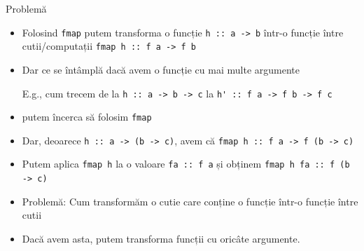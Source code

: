 \documentclass[xcolor=pdftex,romanian,colorlinks]{beamer}
\begin{document}
\begin{frame}{Problemă}
\begin{itemize}
\item Folosind \lstinline$fmap$ putem transforma o funcție \lstinline$h :: a -> b$ într-o funcție între cutii/computații \lstinline$fmap h :: f a -> f b$
\item Dar ce se întâmplă dacă avem o funcție cu mai multe argumente

E.g., cum trecem de la \lstinline$h :: a -> b -> c$   la \lstinline$h' :: f a -> f b -> f c$

\item putem încerca să folosim \lstinline$fmap$

\item Dar, deoarece \lstinline$h :: a -> (b -> c)$, avem că 
\lstinline$fmap h :: f a -> f (b -> c)$

\item Putem aplica \lstinline$fmap h$ la o valoare \lstinline$fa :: f a$ și obținem
\lstinline$fmap h fa :: f (b -> c)$

\item \alert{Problemă:} Cum transformăm o cutie care conține o funcție într-o funcție între cutii

\item Dacă avem asta, putem transforma funcții cu oricâte argumente.
\end{itemize}
\end{frame}
\end{document}
